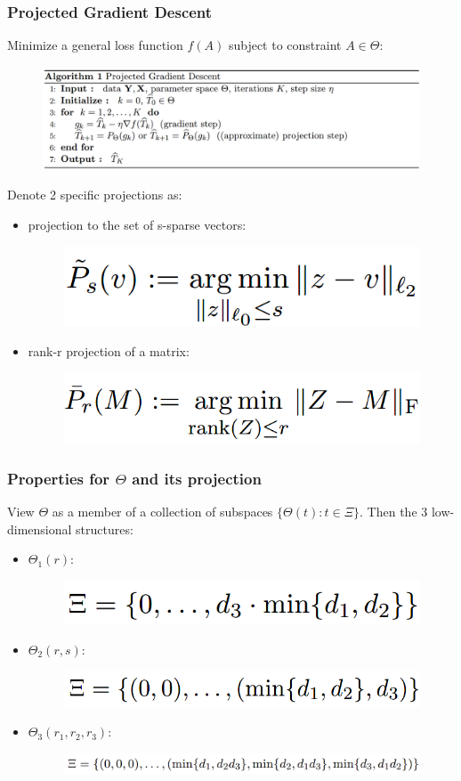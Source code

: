 \documentclass{beamer}
\begin{document}
	\begin{frame}
		\frametitle{Projected Gradient Descent}
		Minimize a general loss function $f(A)$ subject to constraint $A\in \Theta$:
		\begin{figure}
			\includegraphics[width=.9\linewidth]{image007.png}
		\end{figure}
		Denote 2 specific projections as:
		\begin{itemize}
			\item 
			projection to the set of s-sparse vectors:
			\begin{figure}
				\includegraphics[width=.4\linewidth]{image008.png}
			\end{figure}
			\item
			rank-r projection of a matrix:
			\begin{figure}
				\includegraphics[width=.4\linewidth]{image009.png}
			\end{figure}
		\end{itemize}
	\end{frame}
	
	\begin{frame}
		\frametitle{Properties for $\Theta$ and its projection}
		View $\Theta$ as a member of a collection of subspaces $\{\Theta(t): t\in \Xi\}$. Then the 3 low-dimensional structures:
		\begin{itemize}
			\item 
			$\Theta_1(r):$
			\begin{figure}
				\includegraphics[width=.35\linewidth]{image010.png}
			\end{figure}
			\item
			$\Theta_2(r, s):$
			\begin{figure}
				\includegraphics[width=.4\linewidth]{image011.png}
			\end{figure}
			\item
			$\Theta_3(r_1, r_2, r_3):$
			\begin{figure}
				\includegraphics[width=.8\linewidth]{image012.png}
			\end{figure}
		\end{itemize}
	\end{frame}
	
\end{document}
